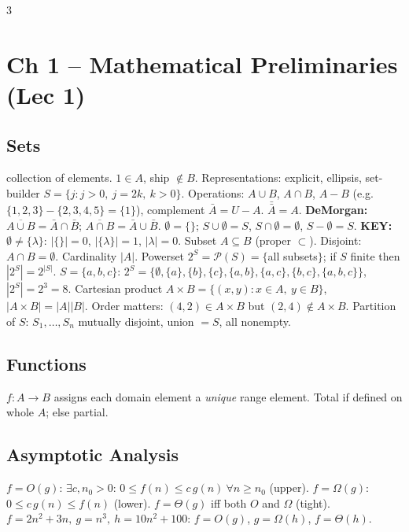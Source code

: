 \documentclass[9pt,a4paper,landscape]{extarticle}
\newcommand{\ex}[1]{\frm[FireBrick]{\textbf{Ex.\ #1}}}
\newcommand{\df}[1]{\frm[DodgerBlue]{\textbf{Def.\ #1}}}
\begin{document}
\begin{multicols*}{3}

\section{Ch 1 -- Mathematical Preliminaries (Lec 1)}
\subsection{Sets}
\df{set} collection of elements. $1\!\in\!A$, ship $\notin B$. Representations: explicit, ellipsis, set-builder $S=\{j: j>0,\ j=2k,\ k>0\}$.
Operations: $A\cup B$, $A\cap B$, $A-B$ (e.g.\ $\{1,2,3\}-\{2,3,4,5\}=\{1\}$), complement $\bar{A}=U-A$. $\bar{\bar{A}}=A$.
\textbf{DeMorgan:} $\overline{A\cup B}=\bar{A}\cap\bar{B}$; $\overline{A\cap B}=\bar{A}\cup\bar{B}$.
$\emptyset=\{\}$; $S\cup\emptyset=S$, $S\cap\emptyset=\emptyset$, $S-\emptyset=S$.
\textbf{KEY:} $\emptyset\neq\{\lambda\}$: $|\{\}|=0$, $|\{\lambda\}|=1$, $|\lambda|=0$.
Subset $A\subseteq B$ (proper $\subset$). Disjoint: $A\cap B=\emptyset$.
Cardinality $|A|$. Powerset $2^S=\mathcal P(S)=\{$all subsets$\}$; if $S$ finite then $|2^S|=2^{|S|}$.
\ex{1.1} $S=\{a,b,c\}$: $2^S=\{\emptyset,\{a\},\{b\},\{c\},\{a,b\},\{a,c\},\{b,c\},\{a,b,c\}\}$, $|2^S|=2^3=8$.
Cartesian product $A\times B=\{(x,y):x\in A,\ y\in B\}$, $|A\times B|=|A||B|$. Order matters: $(4,2)\in A\times B$ but $(2,4)\notin A\times B$.
Partition of $S$: $S_1,\ldots,S_n$ mutually disjoint, union $=S$, all nonempty.

\subsection{Functions}
$f:A\to B$ assigns each domain element a \emph{unique} range element. Total if defined on whole $A$; else partial.

\subsection{Asymptotic Analysis}
$f=O(g)$: $\exists c,n_0>0$: $0\le f(n)\le c\,g(n)\ \forall n\ge n_0$ (upper).
$f=\Omega(g)$: $0\le c\,g(n)\le f(n)$ (lower).
$f=\Theta(g)$ iff both $O$ and $\Omega$ (tight).
\ex{1.3} $f=2n^2+3n,\ g=n^3,\ h=10n^2+100$: $f=O(g)$, $g=\Omega(h)$, $f=\Theta(h)$.


\end{multicols*}
\end{document}
